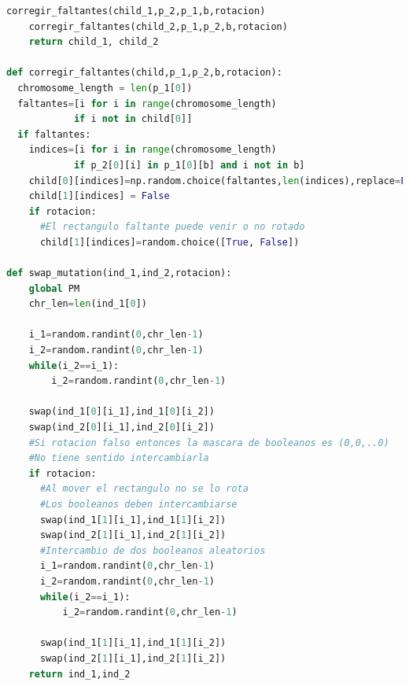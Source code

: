 \documentclass[10pt]{article}
\begin{document}
\begin{lstlisting}[language=Python]
    corregir_faltantes(child_1,p_2,p_1,b,rotacion)
    corregir_faltantes(child_2,p_1,p_2,b,rotacion)
    return child_1, child_2

def corregir_faltantes(child,p_1,p_2,b,rotacion):
  chromosome_length = len(p_1[0])
  faltantes=[i for i in range(chromosome_length) 
  			if i not in child[0]]
  if faltantes:
    indices=[i for i in range(chromosome_length) 
    		if p_2[0][i] in p_1[0][b] and i not in b]
    child[0][indices]=np.random.choice(faltantes,len(indices),replace=False)
    child[1][indices] = False
    if rotacion:
      #El rectangulo faltante puede venir o no rotado 
      child[1][indices]=random.choice([True, False]) 
  
def swap_mutation(ind_1,ind_2,rotacion):
    global PM
    chr_len=len(ind_1[0])

    i_1=random.randint(0,chr_len-1)
    i_2=random.randint(0,chr_len-1)
    while(i_2==i_1):
        i_2=random.randint(0,chr_len-1)

    swap(ind_1[0][i_1],ind_1[0][i_2])
    swap(ind_2[0][i_1],ind_2[0][i_2])
    #Si rotacion falso entonces la mascara de booleanos es (0,0,..0)
    #No tiene sentido intercambiarla  
    if rotacion:
      #Al mover el rectangulo no se lo rota
      #Los booleanos deben intercambiarse
      swap(ind_1[1][i_1],ind_1[1][i_2])
      swap(ind_2[1][i_1],ind_2[1][i_2])
      #Intercambio de dos booleanos aleatorios
      i_1=random.randint(0,chr_len-1)
      i_2=random.randint(0,chr_len-1)
      while(i_2==i_1):
          i_2=random.randint(0,chr_len-1)
      
      swap(ind_1[1][i_1],ind_1[1][i_2])
      swap(ind_2[1][i_1],ind_2[1][i_2])
    return ind_1,ind_2

\end{lstlisting}
\newpage
\tableofcontents
\end{document}
